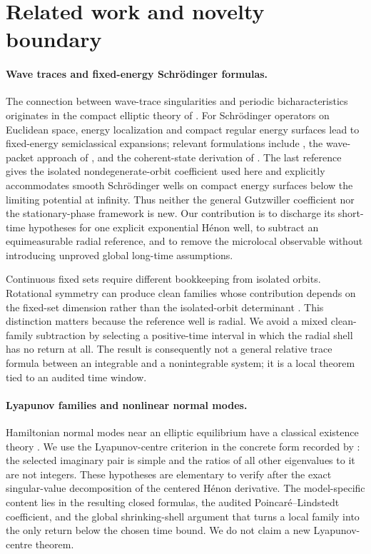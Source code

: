 \section{Related work and novelty boundary}
\label{sec:related}

\paragraph{Wave traces and fixed-energy Schr\"odinger formulas.}
The connection between wave-trace singularities and periodic
bicharacteristics originates in the compact elliptic theory of
\citet{DuistermaatGuillemin1975}.  For Schr\"odinger operators on Euclidean
space, energy localization and compact regular energy surfaces lead to
fixed-energy semiclassical expansions; relevant formulations include
\citet{BrummelhuisUribe1991}, the wave-packet approach of
\citet{PaulUribe1995}, and the coherent-state derivation of
\citet{CombescureRalstonRobert1999}.  The last reference gives the isolated
nondegenerate-orbit coefficient used here and explicitly accommodates smooth
Schr\"odinger wells on compact energy surfaces below the limiting potential
at infinity.  Thus neither the general Gutzwiller coefficient nor the
stationary-phase framework is new.  Our contribution is to discharge its
short-time hypotheses for one explicit exponential H\'enon well, to subtract
an equimeasurable radial reference, and to remove the microlocal observable
without introducing unproved global long-time assumptions.

Continuous fixed sets require different bookkeeping from isolated orbits.
Rotational symmetry can produce clean families whose contribution depends
on the fixed-set dimension rather than the isolated-orbit determinant
\citep{GuilleminUribe1989,Cassanas2007}.  This distinction matters because the reference
well is radial.  We avoid a mixed clean-family subtraction by selecting a
positive-time interval in which the radial shell has no return at all.  The
result is consequently not a general relative trace formula between an
integrable and a nonintegrable system; it is a local theorem tied to an
audited time window.

\paragraph{Lyapunov families and nonlinear normal modes.}
Hamiltonian normal modes near an elliptic equilibrium have a classical
existence theory \citep{Weinstein1973}.  We use the Lyapunov-centre criterion
in the concrete form recorded by \citet{AlligoodYorke1986}: the selected
imaginary pair is simple and the ratios of all other eigenvalues to it are
not integers.  These hypotheses are elementary to verify after the exact
singular-value decomposition of the centered H\'enon derivative.  The
model-specific content lies in the resulting closed formulas, the audited
Poincar\'e--Lindstedt coefficient, and the global shrinking-shell argument
that turns a local family into the only return below the chosen time bound.
We do not claim a new Lyapunov-centre theorem.

